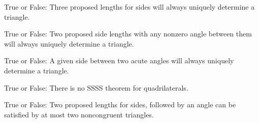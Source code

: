 \documentclass[nooutcomes,noauthor]{ximera}
\author{Bart Snapp}
\begin{document}
\maketitle



\begin{exercise} True or False:  %
  Three proposed lengths for sides will always uniquely determine a
  triangle.
\end{exercise}



\begin{exercise} True or False: %
  Two proposed side lengths with any nonzero angle between them will
  always uniquely determine a triangle.
\end{exercise}



\begin{exercise} True or False:
  A given side between two acute angles will always uniquely determine
  a triangle.
\end{exercise}

\begin{exercise} True or False:
  There is no SSSS theorem for quadrilaterals.
\end{exercise}

\begin{exercise} True or False: 
  Two proposed lengths for sides, followed by an angle can be
  satisfied by at most two noncongruent triangles.
\end{exercise}

\end{document}
